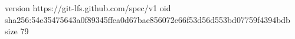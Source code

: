 version https://git-lfs.github.com/spec/v1
oid sha256:54e35475643a0f89345ffea0d67bae856072e66f53d56d553bd07759f4394bdb
size 79
